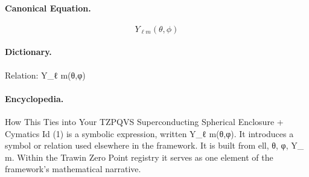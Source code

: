 \paragraph{Canonical Equation.}
\[
Y_{\ell m}(\theta,\phi)
\]

\paragraph{Dictionary.}
Relation: Y\_ℓ m(θ,φ)

\paragraph{Encyclopedia.}
How This Ties into Your TZPQVS Superconducting Spherical Enclosure + Cymatics Id (1) is a symbolic expression, written Y\_ℓ m(θ,φ). It introduces a symbol or relation used elsewhere in the framework. It is built from ell, θ, φ, Y\_ m. Within the Trawin Zero Point registry it serves as one element of the framework's mathematical narrative.
